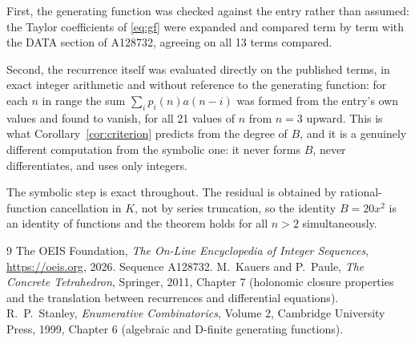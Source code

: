 \documentclass[11pt,a4paper]{article}
\theoremstyle{plain}
\theoremstyle{definition}
\begin{document}
First, the generating function was checked against the entry rather than assumed: the
Taylor coefficients of \eqref{eq:gf} were expanded and compared term by term with the DATA
section of A128732, agreeing on all 13 terms compared.

Second, the recurrence itself was evaluated directly on the published terms, in exact
integer arithmetic and without reference to the generating function: for each $n$ in range
the sum $\sum_{i}p_{i}(n)a(n-i)$ was formed from the entry's own values and found to
vanish, for all 21 values of $n$ from $n=3$ upward. This is what
Corollary~\ref{cor:criterion} predicts from the degree of $B$, and it is a genuinely
different computation from the symbolic one: it never forms $B$, never differentiates, and
uses only integers.

The symbolic step is exact throughout. The residual is obtained by rational-function
cancellation in $K$, not by series truncation, so the identity $B=20 x^{2}$ is an
identity of functions and the theorem holds for all $n>2$ simultaneously.

\begin{thebibliography}{9}
 The OEIS Foundation, \emph{The On-Line Encyclopedia of Integer Sequences},
\url{https://oeis.org}, 2026. Sequence A128732.
 M.~Kauers and P.~Paule, \emph{The Concrete Tetrahedron}, Springer, 2011,
Chapter 7 (holonomic closure properties and the translation between recurrences and
differential equations).
 R.~P.~Stanley, \emph{Enumerative Combinatorics}, Volume 2, Cambridge
University Press, 1999, Chapter 6 (algebraic and D-finite generating functions).
\end{thebibliography}
\end{document}
